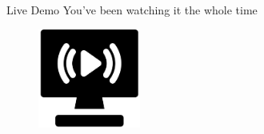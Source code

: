 \documentclass[aspectratio=169]{beamer}
\begin{document}
  \begin{frame}{Live Demo}
    \centering
    You've been watching it the whole time
    \begin{figure}
      \includegraphics[width=0.3\textwidth]{figures/live}
    \end{figure}
  \end{frame}

  \maketitle
%    
%    
\end{document}
